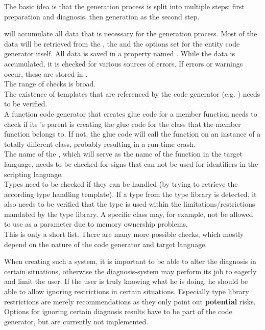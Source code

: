 The basic idea is that the generation process is split into multiple steps: first preparation and diagnosis, then generation as the second step.

 will accumulate all data that is necessary for the generation process. Most of the data will be retrieved from the , the  and the options set for the entity code generator itself. All data is saved in a property named . While the data is accumulated, it is checked for various sources of errors. If errors or warnings occur, these are stored in .\\
The range of checks is broad.\\
The existence of templates that are referenced by the code generator (e.g. ) needs to be verified.\\
A function code generator that creates glue code for a member function needs to check if its 's parent is creating the glue code for the class that the member function belongs to. If not, the glue code will call the function on an instance of a totally different class, probably resulting in a run-time crash.\\
The name of the , which will serve as the name of the function in the target language, needs to be checked for signs that can not be used for identifiers in the scripting language.\\
Types need to be checked if they can be handled (by trying to retrieve the according type handling template). If a type from the type library is detected, it also needs to be verified that the type is used within the limitations/restrictions mandated by the type library. A specific class may, for example, not be allowed to use as a parameter due to memory ownership problems.\\
This is only a short list. There are many more possible checks, which mostly depend on the nature of the code generator and target language. 

When creating such a system, it is important to be able to alter the diagnosis in certain situations, otherwise the diagnosis-system may perform its job to eagerly and limit the user. If the user is truly knowing what he is doing, he should be able to allow ignoring restrictions in certain situations. Especially type library restrictions are merely recommendations as they only point out \textbf{potential} risks. Options for ignoring certain diagnosis results have to be part of the code generator, but are currently not implemented.

